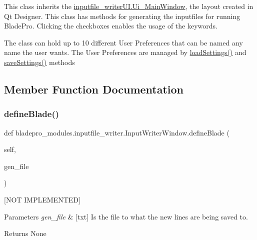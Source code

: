 This class inherits the \hyperlink{a00075}{inputfile\+\_\+writer\+U\+I.\+Ui\+\_\+\+Main\+Window}, the layout created in Qt Designer. This class has methods for generating the inputfiles for running Blade\+Pro. Clicking the checkboxes enables the usage of the keywords.

The class can hold up to 10 different User Preferences that can be named any name the user wants. The User Preferences are managed by \hyperlink{a00071_a0c4f30850537553db0ff2e27059733a4}{load\+Settings()} and \hyperlink{a00071_a723573fade09f206a9c89569885558c1}{save\+Settings()} methods 

\subsection{Member Function Documentation}
\hypertarget{a00071_abf54bdb00a2743fb488463ab7247b146}{}\label{a00071_abf54bdb00a2743fb488463ab7247b146} 
\subsubsection{\texorpdfstring{define\+Blade()}{defineBlade()}}
{\footnotesize\ttfamily def bladepro\+\_\+modules.\+inputfile\+\_\+writer.\+Input\+Writer\+Window.\+define\+Blade (\begin{DoxyParamCaption}\item[{}]{self,  }\item[{}]{gen\+\_\+file }\end{DoxyParamCaption})}



\mbox{[}N\+OT I\+M\+P\+L\+E\+M\+E\+N\+T\+ED\mbox{]} 


\begin{DoxyParams}{Parameters}
{\em gen\+\_\+file} & \mbox{[}txt\mbox{]} Is the file to what the new lines are being saved to. \\
\hline
\end{DoxyParams}
\begin{DoxyReturn}{Returns}
None 
\end{DoxyReturn}
\hypertarget{a00071_a6ec74acbc44de3023188ddd8395b5b30}{}\label{a00071_a6ec74acbc44de3023188ddd8395b5b30} 
